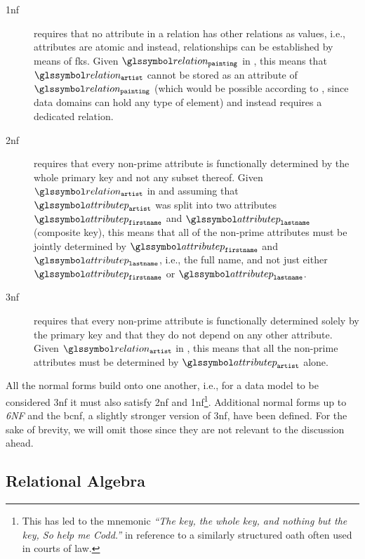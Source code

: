 \begin{description}
    \item[\acrfull{1nf}] requires that no attribute in a relation has other relations as values, i.e., attributes are atomic and instead, relationships can be established by means of \acrshort{fk}s. Given $\relation_{\mathtt{painting}}$ in , this means that $\relation_{\mathtt{artist}}$ cannot be stored as an attribute of $\relation_{\mathtt{painting}}$ (which would be possible according to , since data domains can hold any type of element) and instead requires a dedicated relation.
    \item[\acrfull{2nf}] requires that every non-prime attribute is functionally determined by the whole primary key and not any subset thereof. Given $\relation_{\mathtt{artist}}$ in  and assuming that  $\attributep_{\mathtt{artist}}$ was split into two attributes $\attributep_{\mathtt{firstname}}$ and $\attributep_{\mathtt{lastname}}$ (composite key), this means that all of the non-prime attributes must be jointly determined by $\attributep_{\mathtt{firstname}}$ and $\attributep_{\mathtt{lastname}}$, i.e., the full name, and not just either $\attributep_{\mathtt{firstname}}$ or $\attributep_{\mathtt{lastname}}$.
    \item[\acrfull{3nf}] requires that every non-prime attribute is functionally determined solely by the primary key and that they do not depend on any other attribute. Given $\relation_{\mathtt{artist}}$ in , this means that all the non-prime attributes must be determined by $\attributep_{\mathtt{artist}}$ alone.
\end{description}

All the normal forms build onto one another, i.e., for a data model to be considered \acrshort{3nf} it must also satisfy \acrshort{2nf} and \acrshort{1nf}\footnote{This has led to the mnemonic \emph{``The key, the whole key, and nothing but the key, So help me Codd.''} in reference to a similarly structured oath often used in courts of law.}. Additional normal forms up to \emph{6NF} and the \acrfull{bcnf}, a slightly stronger version of \acrshort{3nf}, have been defined. For the sake of brevity, we will omit those since they are not relevant to the discussion ahead.

\subsection{Relational Algebra}
\label{section:rel_algebra}

